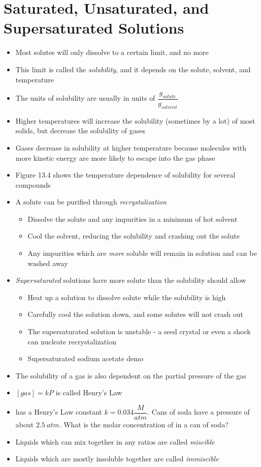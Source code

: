 \documentclass[12pt, openany, letterpaper]{memoir}
\begin{document}
\section{Saturated, Unsaturated, and Supersaturated Solutions}
\begin{itemize}
	\item Most solutes will only dissolve to a certain limit, and no more
	\item This limit is called the \emph{solubility}, and it depends on the solute, solvent, and temperature
	\item The units of solubility are usually in units of $\dfrac{g_{solute}}{g_{solvent}}$
	\item Higher temperatures will increase the solubility (sometimes by a lot) of most solids, but decrease the solubility of gases
	\item Gases decrease in solubility at higher temperature because molecules with more kinetic energy are more likely to escape into the gas phase
	\item Figure 13.4 shows the temperature dependence of solubility for several compounds
	\item A solute can be purified through \emph{recrystalization}
	\begin{itemize}
		\item Dissolve the solute and any impurities in a minimum of hot solvent
		\item Cool the solvent, reducing the solubility and crashing out the solute
		\item Any impurities which are \emph{more} soluble will remain in solution and can be washed away
	\end{itemize}
	\item \emph{Supersaturated} solutions have more solute than the solubility should allow
	\begin{itemize}
		\item Heat up a solution to dissolve solute while the solubility is high
		\item Carefully cool the solution down, and some solutes will not crash out
		\item The supersaturated solution is unstable - a seed crystal or even a shock can nucleate recrystalization
		\item Supersaturated sodium acetate demo
	\end{itemize}
	\item The solubility of a gas is also dependent on the partial pressure of the gas
	\item $[gas] = kP$ is called Henry's Law
	\item {} has a Henry's Law constant $k=0.034\dfrac{M}{atm}$. Cans of soda have a pressure of about $2.5~atm$. What is the molar concentration of  in a can of soda?
	\item Liquids which can mix together in any ratios are called \emph{miscible}
	\item Liquids which are mostly insoluble together are called \emph{immiscible}
\end{itemize}
\end{document}
